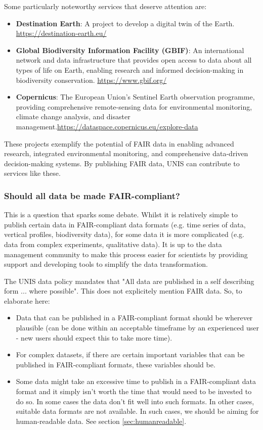 \documentclass[a4paper,12pt]{article}
\begin{document}
Some particularly noteworthy services that deserve attention are:
\begin{itemize}
    \item \textbf{Destination Earth}: A project to develop a digital twin of the Earth. \url{https://destination-earth.eu/}
    \item \textbf{Global Biodiversity Information Facility (GBIF)}: An international network and data infrastructure that provides open access to data about all types of life on Earth, enabling research and informed decision-making in biodiversity conservation. \url{https://www.gbif.org/}
    \item \textbf{Copernicus}: The European Union's Sentinel Earth observation programme, providing comprehensive remote-sensing data for environmental monitoring, climate change analysis, and disaster management.\url{https://dataspace.copernicus.eu/explore-data}
\end{itemize}

These projects exemplify the potential of FAIR data in enabling advanced research, integrated environmental monitoring, and comprehensive data-driven decision-making systems. By publishing FAIR data, UNIS can contribute to services like these. 

\subsubsection{Should all data be made FAIR-compliant?}

This is a question that sparks some debate. Whilst it is relatively simple to publish certain data in FAIR-compliant data formats (e.g. time series of data, vertical profiles, biodiversity data), for some data it is more complicated (e.g. data from complex experiments, qualitative data). It is up to the data management community to make this process easier for scientists by providing support and developing tools to simplify the data transformation. 

The UNIS data policy \citep{UNISdatapolicy} mandates that "All data are published in a self describing form ... where possible". This does not explicitely mention FAIR data. So, to elaborate here:
\begin{itemize}
\item Data that can be published in a FAIR-compliant format should be wherever plausible (can be done within an acceptable timeframe by an experienced user - new users should expect this to take more time).
\item For complex datasets, if there are certain important variables that can be published in FAIR-compliant formats, these variables should be. 
\item Some data might take an excessive time to publish in a FAIR-compliant data format and it simply isn't worth the time that would need to be invested to do so. In some cases the data don't fit well into such formats. In other cases, suitable data formats are not available. In such cases, we should be aiming for human-readable data. See section \ref{sec:humanreadable}.   
\end{itemize} 
\end{document}
